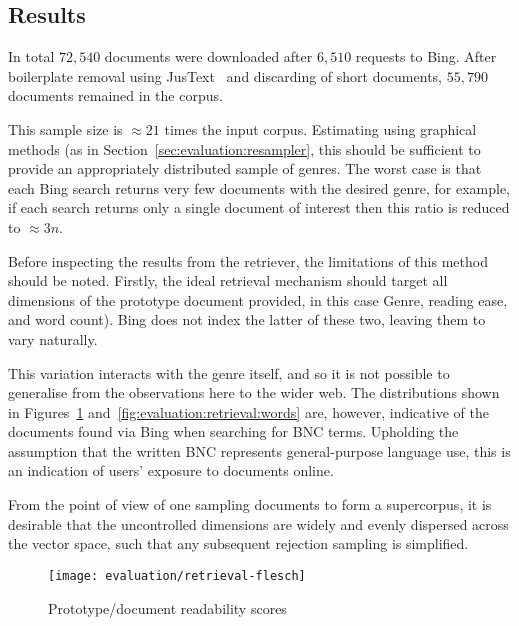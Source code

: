 \subsection{Results}
\label{sec:evaluation:results}

In total $72,540$ documents were downloaded after $6,510$ requests to Bing.  After boilerplate removal using JusText~\cite{pomikalek2013justext} and discarding of short documents, $55,790$ documents remained in the corpus.


This sample size is $\approx 21$ times the input corpus.  Estimating using graphical methods (as in Section~\ref{sec:evaluation:resampler}, this should be sufficient to provide an appropriately distributed sample of genres.  The worst case is that each Bing search returns very few documents with the desired genre, for example, if each search returns only a single document of interest then this ratio is reduced to $\approx 3n$.



Before inspecting the results from the retriever, the limitations of this method should be noted.  Firstly, the ideal retrieval mechanism should target all dimensions of the prototype document provided, in this case Genre, reading ease, and word count).  Bing does not index the latter of these two, leaving them to vary naturally.

This variation interacts with the genre itself, and so it is not possible to generalise from the observations here to the wider web.  The distributions shown in Figures~\ref{fig:evaluation:retrieval:flesh} and~\ref{fig:evaluation:retrieval:words} are, however, indicative of the documents found via Bing when searching for BNC terms.  Upholding the assumption that the written BNC represents general-purpose language use, this is an indication of users' exposure to documents online.%

From the point of view of one sampling documents to form a supercorpus, it is desirable that the uncontrolled dimensions are widely and evenly dispersed across the vector space, such that any subsequent rejection sampling is simplified.


\begin{figure}[Ht]
    \centering
    \texttt{[image: evaluation/retrieval-flesch]}
    \caption{Prototype/document readability scores}
    \label{fig:evaluation:retrieval:flesh}
\end{figure}

